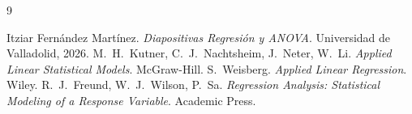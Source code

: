 \begin{thebibliography}{9}
    Itziar Fernández Martínez.
    \textit{Diapositivas Regresión y ANOVA}. Universidad de Valladolid, 2026.
    M.~H.~Kutner, C.~J.~Nachtsheim, J.~Neter, W.~Li.
    \textit{Applied Linear Statistical Models}. McGraw-Hill.
    S.~Weisberg. \textit{Applied Linear Regression}. Wiley.
    R.~J.~Freund, W.~J.~Wilson, P.~Sa.
    \textit{Regression Analysis: Statistical Modeling of a Response Variable}. Academic Press.
\end{thebibliography}
